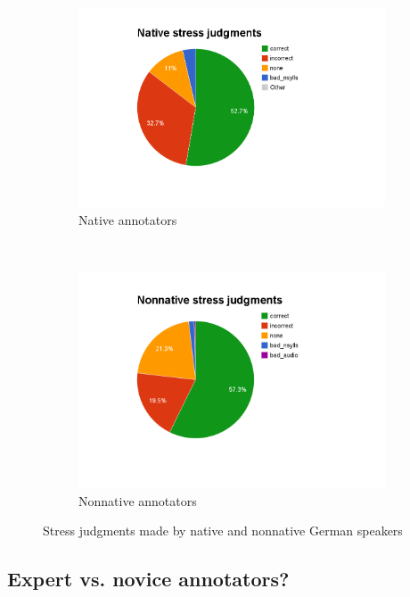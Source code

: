 		
			\begin{figure}[htb]
				\centering
				\begin{subfigure}[b]{.5\textwidth}
					\centering
					\includegraphics[width=\textwidth]{img/annotation/nativePie}
					\caption{Native annotators}
					\label{fig:l1pies:native}
				\end{subfigure}%
				~
				\begin{subfigure}[b]{.5\textwidth}
					\centering
					\includegraphics[width=\textwidth]{img/annotation/nonnativePie}
					\caption{Nonnative annotators}
					\label{fig:l1pies:nonnative}
				\end{subfigure}%
				\caption{Stress judgments made by native and nonnative German speakers}
				\label{fig:l1pies}
			\end{figure}
			
		
		\subsection{Expert vs. novice annotators?}
		\label{sec:results:expert}
		
